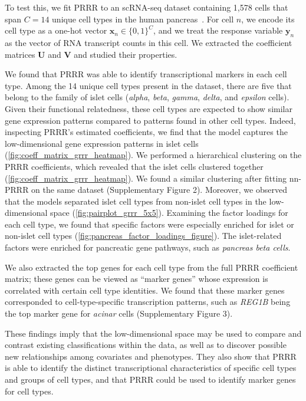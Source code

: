 \documentclass{bmcart}
\begin{document}
To test this, we fit PRRR to an scRNA-seq dataset containing 1,578 cells that span $C=14$ unique cell types in the human pancreas~\citep{baron2016single}. For cell $n$, we encode its cell type as a one-hot vector $\mathbf{x}_n \in \{0, 1\}^{C}$, and we treat the response variable $\mathbf{y}_n$ as the vector of RNA transcript counts in this cell. We extracted the coefficient matrices $\mathbf{U}$ and $\mathbf{V}$ and studied their properties.

We found that PRRR was able to identify transcriptional markers in each cell type. Among the 14 unique cell types present in the dataset, there are five that belong to the family of islet cells (\emph{alpha}, \emph{beta}, \emph{gamma}, \emph{delta}, and \emph{epsilon} cells). Given their functional relatedness, these cell types are expected to show similar gene expression patterns compared to patterns found in other cell types. Indeed, inspecting PRRR's estimated coefficients, we find that the model captures the low-dimensional gene expression patterns in islet cells (\autoref{fig:coeff_matrix_grrr_heatmap}). We performed a hierarchical clustering on the PRRR coefficients, which revealed that the islet cells clustered together (\autoref{fig:coeff_matrix_grrr_heatmap}). We found a similar clustering after fitting nn-PRRR on the same dataset (Supplementary Figure 2). %
Moreover, we observed that the models separated islet cell types from non-islet cell types in the low-dimensional space (\autoref{fig:pairplot_grrr_5x5}). Examining the factor loadings for each cell type, we found that specific factors were especially enriched for islet or non-islet cell types (\autoref{fig:pancreas_factor_loadings_figure}). The islet-related factors were enriched for pancreatic gene pathways, such as \emph{pancreas beta cells}. 

We also extracted the top genes for each cell type from the full PRRR coefficient matrix; these genes can be viewed as ``marker genes'' whose expression is correlated with certain cell type identities. We found that these marker genes corresponded to cell-type-specific transcription patterns, such as \emph{REG1B} being the top marker gene for \emph{acinar} cells (Supplementary Figure 3). %

These findings imply that the low-dimensional space may be used to compare and contrast existing classifications within the data, as well as to discover possible new relationships among covariates and phenotypes. They also show that PRRR is able to identify the distinct transcriptional characteristics of specific cell types and groups of cell types, and that PRRR could be used to identify marker genes for cell types.
\end{document}
